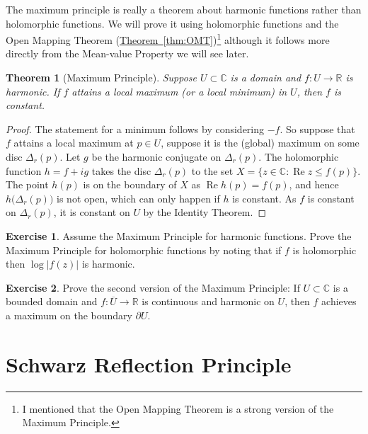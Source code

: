 \documentclass[12pt,openany]{book}
\renewcommand{\Re}{\operatorname{Re}}
\newcommand{\sabs}[1]{\lvert {#1} \rvert}
\newcommand{\C}{{\mathbb{C}}}
\newcommand{\R}{{\mathbb{R}}}
\theoremstyle{plain}
\newtheorem{thm}{Theorem}[section]
\theoremstyle{remark}
\theoremstyle{definition}
\newenvironment{exbox}{%
    \def\FrameCommand{\vrule width 1pt \relax\hspace {10pt}}%
    \MakeFramed {\advance \hsize -\width \FrameRestore }%
}{%
    \endMakeFramed
}
\theoremstyle{exercise}
\newtheorem{exercise}{Exercise}[section]
\theoremstyle{example}
\newcommand{\thmref}[1]{\hyperref[#1]{Theorem~\ref*{#1}}}
\begin{document}
The maximum principle is really a theorem about harmonic functions rather
than holomorphic functions.  We will prove it using holomorphic functions
and the Open Mapping Theorem (\thmref{thm:OMT})\footnote{I mentioned that
the Open Mapping Theorem is a strong version of the Maximum Principle.}
although it follows more directly from the Mean-value Property we will see
later.

\begin{thm}[Maximum Principle]
Suppose $U \subset \C$ is a domain and $f \colon U \to \R$
is harmonic.  If $f$ attains a local maximum (or a local minimum) in $U$, then $f$ is constant.
\end{thm}

\begin{proof}
The statement for a minimum follows by considering $-f$.  So suppose that
$f$ attains a local maximum at $p \in U$, suppose it is the (global)
maximum on some disc $\Delta_r(p)$.  Let $g$ be the harmonic conjugate on
$\Delta_r(p)$.  The holomorphic function $h = f+ig$ takes the disc
$\Delta_r(p)$ to the set $X = \{ z \in \C : \Re z \leq f(p) \}$.  The
point $h(p)$ is on the boundary of $X$ as $\Re h(p)= f(p)$, and hence
$h\bigl(\Delta_r(p)\bigr)$ is not open, which can only happen if $h$ is
constant.  As $f$ is constant on $\Delta_r(p)$, it is constant on $U$ by the
Identity Theorem.
\end{proof}

\begin{exbox}
\begin{exercise}
Assume the Maximum Principle for harmonic functions.  Prove the Maximum
Principle for holomorphic functions by noting that if $f$ is holomorphic
then $\log \sabs{f(z)}$ is harmonic.
\end{exercise}

\begin{exercise}
Prove the second version of the Maximum Principle: If $U \subset \C$
is a bounded domain and $f \colon \overline{U}
\to \R$ is continuous and harmonic on $U$, then $f$ achieves a maximum
on the boundary $\partial U$.
\end{exercise}
\end{exbox}


\section{Schwarz Reflection Principle}
\end{document}
